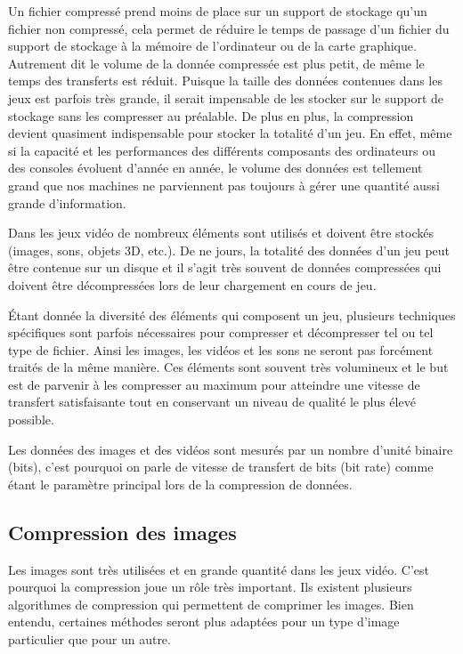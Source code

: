 \documentclass[a4paper, 12pt]{article} %
\begin{document}
Un fichier compressé prend moins de place sur un support de stockage qu'un fichier non compressé, cela permet de réduire le temps de passage d'un fichier du support de stockage à la mémoire de l'ordinateur ou de la carte graphique. Autrement dit le volume de la donnée compressée est plus petit, de même le temps des transferts est réduit. Puisque la taille des données contenues dans les jeux est parfois très grande, il serait impensable de les stocker sur le support de stockage sans les compresser au préalable. De plus en plus, la compression devient quasiment indispensable pour stocker la totalité d'un jeu. En effet, même si la capacité et les performances des différents composants des ordinateurs ou des consoles évoluent d'année en année, le volume des données est tellement grand que nos machines ne parviennent pas toujours à gérer une quantité aussi grande d'information.

Dans les jeux vidéo de nombreux éléments sont utilisés et doivent être stockés (images, sons, objets 3D, etc.). De ne jours, la totalité des données d'un jeu peut être contenue sur un disque et il s'agit très souvent de données compressées qui doivent être décompressées lors de leur chargement en cours de jeu.

Étant donnée la diversité des éléments qui composent un jeu, plusieurs techniques spécifiques sont parfois nécessaires pour compresser et décompresser tel ou tel type de fichier. Ainsi les images, les vidéos et les sons ne seront pas forcément traités de la même manière. Ces éléments sont souvent très volumineux et le but est de parvenir à les compresser au maximum pour atteindre une vitesse de transfert satisfaisante tout en conservant un niveau de qualité le plus élevé possible. 

Les données des images et des vidéos sont mesurés par un nombre d'unité binaire (bits), c'est pourquoi on parle de vitesse de transfert de bits (bit rate) comme étant le paramètre principal lors de la compression de données. 

\newpage
\subsection{Compression des images}
Les images sont très utilisées et en grande quantité dans les jeux vidéo. C'est pourquoi la compression joue un rôle très important. Ils existent plusieurs algorithmes de compression qui permettent de comprimer les images. Bien entendu, certaines méthodes seront plus adaptées pour un type d'image particulier que pour un autre. 
\end{document}
